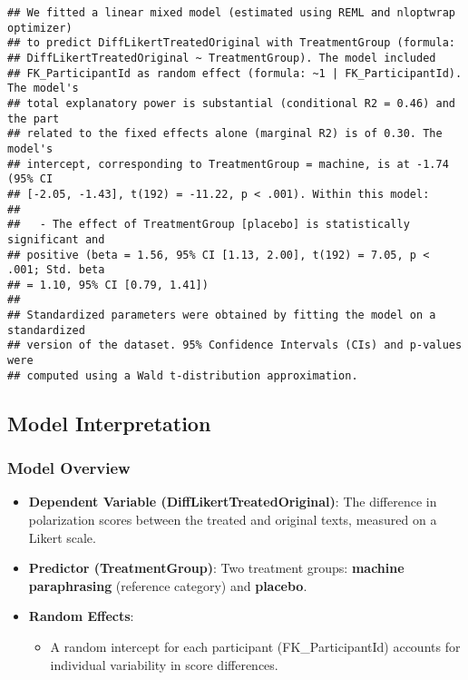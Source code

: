\documentclass[
]{article}
\providecommand{\tightlist}{%
  \setlength{\itemsep}{0pt}\setlength{\parskip}{0pt}}
\begin{document}
\begin{verbatim}
## We fitted a linear mixed model (estimated using REML and nloptwrap optimizer)
## to predict DiffLikertTreatedOriginal with TreatmentGroup (formula:
## DiffLikertTreatedOriginal ~ TreatmentGroup). The model included
## FK_ParticipantId as random effect (formula: ~1 | FK_ParticipantId). The model's
## total explanatory power is substantial (conditional R2 = 0.46) and the part
## related to the fixed effects alone (marginal R2) is of 0.30. The model's
## intercept, corresponding to TreatmentGroup = machine, is at -1.74 (95% CI
## [-2.05, -1.43], t(192) = -11.22, p < .001). Within this model:
## 
##   - The effect of TreatmentGroup [placebo] is statistically significant and
## positive (beta = 1.56, 95% CI [1.13, 2.00], t(192) = 7.05, p < .001; Std. beta
## = 1.10, 95% CI [0.79, 1.41])
## 
## Standardized parameters were obtained by fitting the model on a standardized
## version of the dataset. 95% Confidence Intervals (CIs) and p-values were
## computed using a Wald t-distribution approximation.
\end{verbatim}

\subsection{\texorpdfstring{\textbf{Model
Interpretation}}{Model Interpretation}}\label{model-interpretation-2}

\subsubsection{\texorpdfstring{\textbf{Model
Overview}}{Model Overview}}\label{model-overview-2}

\begin{itemize}
\tightlist
\item
  \textbf{Dependent Variable (DiffLikertTreatedOriginal)}: The
  difference in polarization scores between the treated and original
  texts, measured on a Likert scale.
\item
  \textbf{Predictor (TreatmentGroup)}: Two treatment groups:
  \textbf{machine paraphrasing} (reference category) and
  \textbf{placebo}.
\item
  \textbf{Random Effects}:

  \begin{itemize}
  \tightlist
  \item
    A random intercept for each participant (FK\_ParticipantId) accounts
    for individual variability in score differences.
  \end{itemize}
\end{itemize}
\end{document}
